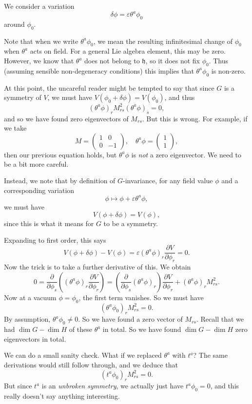 \documentclass[a4paper]{article}
\begin{document}
We consider a variation
\[
  \delta \phi = \varepsilon \theta^a \phi_0
\]
around $\phi_0$.

Note that when we write $\theta^a \phi_0$, we mean the resulting infinitesimal change of $\phi_0$ when $\theta^a$ acts on field. For a general Lie algebra element, this may be zero. However, we know that $\theta^a$ does not belong to $\mathfrak{h}$, so it does not fix $\phi_0$. Thus (assuming sensible non-degeneracy conditions) this implies that $\theta^a \phi_0$ is non-zero.

At this point, the uncareful reader might be tempted to say that since $G$ is a symmetry of $V$, we must have $V(\phi_0 + \delta \phi) = V(\phi_0)$, and thus
\[
  (\theta^a \phi)_r M_{rs}^2 (\theta^a \phi)_s = 0,
\]
and so we have found zero eigenvectors of $M_{rs}$. But this is wrong. For example, if we take
\[
  M =
  \begin{pmatrix}
    1 & 0\\
    0 & -1
  \end{pmatrix},\quad
  \theta^a \phi =
  \begin{pmatrix}
    1\\1
  \end{pmatrix},
\]
then our previous equation holds, but $\theta^a \phi$ is \emph{not} a zero eigenvector. We need to be a bit more careful.

Instead, we note that by definition of $G$-invariance, for any field value $\phi$ and a corresponding variation
\[
  \phi \mapsto \phi + \varepsilon \theta^a \phi,
\]
we must have
\[
  V(\phi + \delta \phi) = V(\phi),
\]
since this is what it means for $G$ to be a symmetry.

Expanding to first order, this says
\[
  V(\phi + \delta \phi) - V(\phi) = \varepsilon (\theta^a \phi)_r \frac{\partial V}{\partial \phi_r} = 0.
\]
Now the trick is to take a further derivative of this. We obtain
\[
  0 = \frac{\partial}{\partial \phi_s} \left((\theta^a \phi)_r \frac{\partial V}{\partial \phi_r}\right) = \left(\frac{\partial}{\partial \phi_s} (\theta^a \phi)_r\right) \frac{\partial V}{\partial \phi_r} + (\theta^a \phi)_r M_{rs}^2.
\]
Now at a vacuum $\phi = \phi_0$, the first term vanishes. So we must have
\[
  (\theta^a \phi_0)_r M_{rs}^2 = 0.
\]
By assumption, $\theta^a \phi_0 \not= 0$. So we have found a zero vector of $M_{rs}$. Recall that we had $\dim G - \dim H$ of these $\theta^a$ in total. So we have found $\dim G - \dim H$ zero eigenvectors in total.

We can do a small sanity check. What if we replaced $\theta^a$ with $t^a$? The same derivations would still follow through, and we deduce that
\[
  (t^a \phi_0)_r M_{rs}^2 = 0.
\]
But since $t^a$ is an \emph{unbroken symmetry}, we actually just have $t^a \phi_0 = 0$, and this really doesn't say anything interesting.
\end{document}
